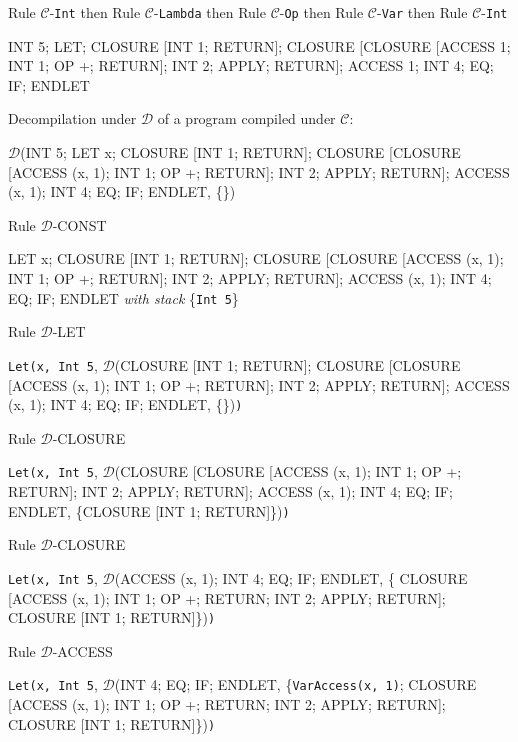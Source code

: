 \documentclass[11pt]{article}
\begin{document}
\begin{landscape}
{\smallskip
\noindent Rule $\mathcal{C}$-\texttt{Int} then Rule $\mathcal{C}$-\texttt{Lambda} then Rule $\mathcal{C}$-\texttt{Op} then Rule $\mathcal{C}$-\texttt{Var} then Rule $\mathcal{C}$-\texttt{Int}
\smallskip

\noindent INT 5; LET; CLOSURE [INT 1; RETURN]; CLOSURE [CLOSURE [ACCESS 1; INT 1; OP +; RETURN]; INT 2; APPLY; RETURN]; ACCESS 1; INT 4; EQ; IF; ENDLET


}

\newpage

{\small

\noindent Decompilation under $\mathcal{D}$ of a program compiled under $\mathcal{C}$:

\bigskip

\noindent $\mathcal{D}$(INT 5; LET x; CLOSURE [INT 1; RETURN]; CLOSURE [CLOSURE [ACCESS (x, 1); INT 1; OP +; RETURN]; INT 2; APPLY; RETURN]; ACCESS (x, 1); INT 4; EQ; IF; ENDLET, \{\})

\smallskip
\noindent Rule $\mathcal{D}$-CONST
\smallskip

\noindent LET x; CLOSURE [INT 1; RETURN]; CLOSURE [CLOSURE [ACCESS (x, 1); INT 1; OP +; RETURN]; INT 2; APPLY; RETURN]; ACCESS (x, 1); INT 4; EQ; IF; ENDLET \textit{with stack} \{\texttt{Int 5}\}

\smallskip
\noindent Rule $\mathcal{D}$-LET
\smallskip

\noindent \texttt{Let(x, }\texttt{Int 5}, $\mathcal{D}$(CLOSURE [INT 1; RETURN]; CLOSURE [CLOSURE [ACCESS (x, 1); INT 1; OP +; RETURN]; INT 2; APPLY; RETURN]; ACCESS (x, 1); INT 4; EQ; IF; ENDLET, \{\})\texttt{)}

\smallskip
\noindent Rule $\mathcal{D}$-CLOSURE
\smallskip

\noindent \texttt{Let(x, }\texttt{Int 5}, $\mathcal{D}$(CLOSURE [CLOSURE [ACCESS (x, 1); INT 1; OP +; RETURN]; INT 2; APPLY; RETURN]; ACCESS (x, 1); INT 4; EQ; IF; ENDLET, \{CLOSURE [INT 1; RETURN]\})\texttt{)}

\smallskip
\noindent Rule $\mathcal{D}$-CLOSURE
\smallskip

\noindent \texttt{Let(x, }\texttt{Int 5}, $\mathcal{D}$(ACCESS (x, 1); INT 4; EQ; IF; ENDLET, \{ CLOSURE [ACCESS (x, 1); INT 1; OP +; RETURN; INT 2; APPLY; RETURN]; CLOSURE [INT 1; RETURN]\})\texttt{)}

\smallskip
\noindent Rule $\mathcal{D}$-ACCESS
\smallskip

\noindent \texttt{Let(x, }\texttt{Int 5}, $\mathcal{D}$(INT 4; EQ; IF; ENDLET, \{\texttt{VarAccess(x, 1)}; CLOSURE [ACCESS (x, 1); INT 1; OP +; RETURN; INT 2; APPLY; RETURN]; CLOSURE [INT 1; RETURN]\})\texttt{)}

}
\end{landscape}
\end{document}
